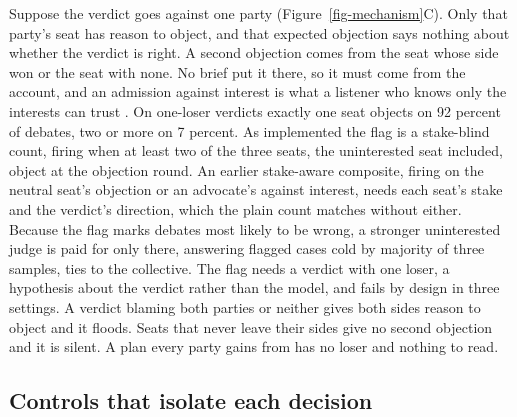 Suppose the verdict goes against one party (Figure~\ref{fig-mechanism}C).
Only that party's seat has reason to object, and that expected objection
says nothing about whether the verdict is right. A second objection comes
from the seat whose side won or the seat with none. No brief put it there,
so it must come from the account, and an admission against interest is
what a listener who knows only the interests can trust
\citep{milgrom1986relying,lipman1995robust}.
On one-loser verdicts exactly one seat objects on 92 percent of debates,
two or more on 7
percent.
As implemented the flag is a stake-blind count, firing when at least two
of the three seats, the uninterested seat included, object at the
objection round.
An earlier stake-aware composite, firing on the neutral seat's objection
or an advocate's against interest, needs each seat's stake and the
verdict's direction, which the plain count matches without
either.
Because the flag marks debates most likely to be wrong, a stronger
uninterested judge is paid for only there, answering flagged cases cold
by majority of three samples, ties to the
collective.
The flag needs a verdict with one loser, a hypothesis about the verdict
rather than the model, and fails by design in three settings. A verdict
blaming both parties or neither gives both sides reason to object and it
floods. Seats that never leave their sides give no second objection and
it is silent. A plan every party gains from has no loser and nothing to
read.

\subsection{Controls that isolate each decision}
\label{sec-method-controls}
\label{sec-method-designs}

